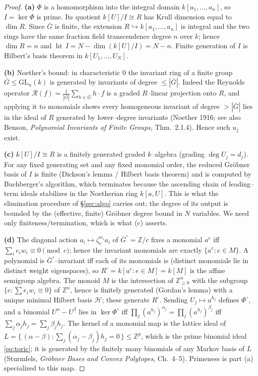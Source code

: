 \documentclass{amsart}
\theoremstyle{definition}
\DeclareMathOperator{\height}{ht}
\begin{document}
\begin{proof}
\textbf{(a)} $\Phi$ is a homomorphism into the integral domain
$k[a_1,\dots,a_n]$, so $I=\ker\Phi$ is prime. Its quotient $k[U]/I\cong R$ has
Krull dimension equal to $\dim R$. Since $\bar G$ is finite, the extension
$R\hookrightarrow k[a_1,\dots,a_n]$ is integral and the two rings have the same
fraction field transcendence degree $n$ over $k$; hence $\dim R=n$ and
$\height\,I=N-\dim(k[U]/I)=N-n$. Finite generation of $I$ is Hilbert's basis
theorem in $k[U_1,\dots,U_N]$.

\textbf{(b)} Noether's bound: in characteristic $0$ the invariant ring of a finite
group $\bar G\le\mathrm{GL}_n(k)$ is generated by invariants of degree
$\le|\bar G|$. Indeed the Reynolds operator $\mathcal R(f)=\frac1{|\bar G|}
\sum_{h\in\bar G}h\cdot f$ is a graded $R$--linear projection onto $R$, and
applying it to monomials shows every homogeneous invariant of degree $>|\bar G|$
lies in the ideal of $R$ generated by lower--degree invariants (Noether 1916;
see also Benson, \emph{Polynomial Invariants of Finite Groups}, Thm.~2.1.4).
Hence such $u_j$ exist.

\textbf{(c)} $k[U]/I\cong R$ is a finitely generated graded $k$--algebra (grading
$\deg U_j=d_j$). For any fixed generating set and any fixed monomial order, the
reduced Gr\"obner basis of $I$ is finite (Dickson's lemma / Hilbert basis
theorem) and is computed by Buchberger's algorithm, which terminates because the
ascending chain of leading--term ideals stabilizes in the Noetherian ring
$k[a,U]$. This is what the elimination procedure of \S\ref{sec:algo} carries out;
the degree of its output is bounded by the (effective, finite) Gr\"obner degree
bound in $N$ variables. We need only finiteness/termination, which is what (c)
asserts.

\textbf{(d)} The diagonal action $a_i\mapsto\zeta_c^{w_i}a_i$ of
$\bar G^{\circ}=\mathbb{Z}/c$ fixes a monomial $a^{e}$ iff
$\sum_i e_i w_i\equiv 0\pmod c$; hence the invariant monomials are exactly
$\{a^{e}:e\in M\}$. A polynomial is $\bar G^\circ$--invariant iff each of its
monomials is (distinct monomials lie in distinct weight eigenspaces), so
$R^{\circ}=k[a^{e}:e\in M]=k[M]$ is the affine semigroup algebra. The monoid $M$
is the intersection of $\mathbb{Z}_{\ge0}^n$ with the subgroup
$\{e:\sum e_i w_i\equiv0\}$ of $\mathbb{Z}^n$, hence is finitely generated
(Gordan's lemma) with a unique minimal Hilbert basis $\mathcal H$; these generate
$R^{\circ}$. Sending $U_j\mapsto a^{h_j}$ defines $\Phi^{\circ}$, and a binomial
$U^{\alpha}-U^{\beta}$ lies in $\ker\Phi^{\circ}$ iff
$\prod_j(a^{h_j})^{\alpha_j}=\prod_j(a^{h_j})^{\beta_j}$ iff
$\sum_j\alpha_j h_j=\sum_j\beta_j h_j$. The kernel of a monomial map is the
lattice ideal of $L=\{\,(\alpha-\beta):\sum_j(\alpha_j-\beta_j)h_j=0\,\}\le
\mathbb{Z}^p$, which is the prime binomial ideal \eqref{eq:toric}; it is
generated by the finitely many binomials of any Markov basis of $L$ (Sturmfels,
\emph{Gr\"obner Bases and Convex Polytopes}, Ch.~4--5). Primeness is part (a)
specialized to this map.


\end{proof}
\end{document}

